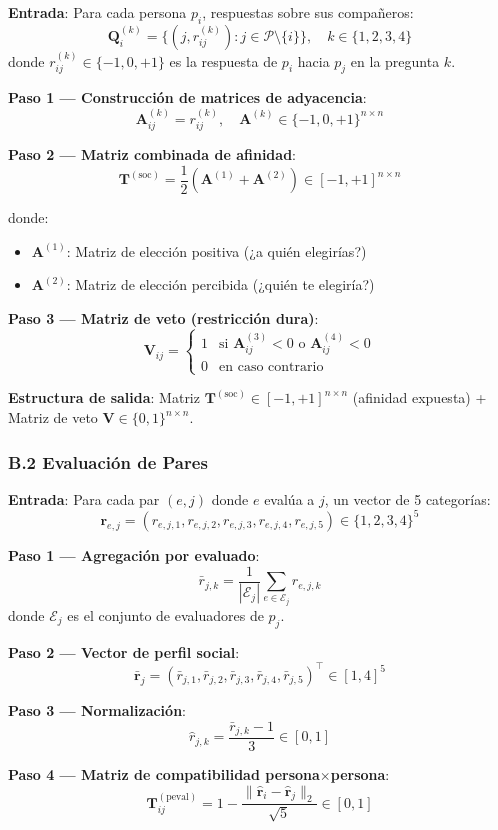 \documentclass[12pt,a4paper]{article}
\begin{document}
\begin{formulaBox}
\textbf{Entrada}: Para cada persona $p_i$, respuestas sobre sus compañeros:
\[
\mathbf{Q}^{(k)}_i = \{(j, r_{ij}^{(k)}) : j \in \mathcal{P} \setminus \{i\}\}, \quad k \in \{1,2,3,4\}
\]
donde $r_{ij}^{(k)} \in \{-1, 0, +1\}$ es la respuesta de $p_i$ hacia $p_j$ en la pregunta $k$.

\textbf{Paso 1 --- Construcción de matrices de adyacencia}:
\[
\mathbf{A}^{(k)}_{ij} = r_{ij}^{(k)}, \quad \mathbf{A}^{(k)} \in \{-1, 0, +1\}^{n \times n}
\]

\textbf{Paso 2 --- Matriz combinada de afinidad}:
\[
\mathbf{T}^{(\text{soc})} = \frac{1}{2}\left(\mathbf{A}^{(1)} + \mathbf{A}^{(2)}\right) \in [-1, +1]^{n \times n}
\]

donde:
\begin{itemize}
    \item $\mathbf{A}^{(1)}$: Matriz de elección positiva (¿a quién elegirías?)
    \item $\mathbf{A}^{(2)}$: Matriz de elección percibida (¿quién te elegiría?)
\end{itemize}

\textbf{Paso 3 --- Matriz de veto (restricción dura)}:
\[
\mathbf{V}_{ij} = \begin{cases} 1 & \text{si } \mathbf{A}^{(3)}_{ij} < 0 \text{ o } \mathbf{A}^{(4)}_{ij} < 0 \\ 0 & \text{en caso contrario} \end{cases}
\]
\end{formulaBox}

\textbf{Estructura de salida}: Matriz $\mathbf{T}^{(\text{soc})} \in [-1,+1]^{n \times n}$ (afinidad expuesta) + Matriz de veto $\mathbf{V} \in \{0,1\}^{n \times n}$.

\subsubsection{B.2 Evaluación de Pares}

\begin{formulaBox}
\textbf{Entrada}: Para cada par $(e, j)$ donde $e$ evalúa a $j$, un vector de 5 categorías:
\[
\mathbf{r}_{e,j} = (r_{e,j,1}, r_{e,j,2}, r_{e,j,3}, r_{e,j,4}, r_{e,j,5}) \in \{1,2,3,4\}^5
\]

\textbf{Paso 1 --- Agregación por evaluado}:
\[
\bar{r}_{j,k} = \frac{1}{|\mathcal{E}_j|} \sum_{e \in \mathcal{E}_j} r_{e,j,k}
\]
donde $\mathcal{E}_j$ es el conjunto de evaluadores de $p_j$.

\textbf{Paso 2 --- Vector de perfil social}:
\[
\bar{\mathbf{r}}_j = (\bar{r}_{j,1}, \bar{r}_{j,2}, \bar{r}_{j,3}, \bar{r}_{j,4}, \bar{r}_{j,5})^\top \in [1, 4]^5
\]

\textbf{Paso 3 --- Normalización}:
\[
\hat{r}_{j,k} = \frac{\bar{r}_{j,k} - 1}{3} \in [0, 1]
\]

\textbf{Paso 4 --- Matriz de compatibilidad persona$\times$persona}:
\[
\mathbf{T}^{(\text{peval})}_{ij} = 1 - \frac{\|\hat{\mathbf{r}}_i - \hat{\mathbf{r}}_j\|_2}{\sqrt{5}} \in [0, 1]
\]
\end{formulaBox}
\end{document}

